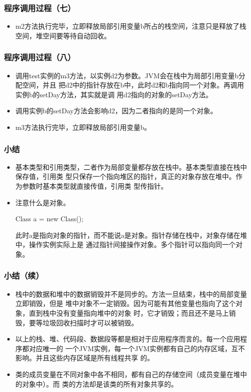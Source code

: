 \documentclass[hyperref={pdfpagelabels=false},compress,table]{beamer} %
\newcommand{\kai}{\CJKfamily{KaiTi}}
\begin{document}
\begin{frame}[fragile] %
\frametitle{程序调用过程（七）}
\begin{itemize}
\item m2方法执行完毕，立即释放局部引用变量b所占的栈空间，注意只是释放了栈空间，堆空间要等待自动回收。
\end{itemize}
\end{frame}

\begin{frame}[fragile] %
\frametitle{程序调用过程（八）}
\begin{itemize}
\item 调用test实例的m3方法，以实例d2为参数。JVM会在栈中为局部引用变量b分配空间，并且
  把d2中的指针存放在b中，此时d2和b指向同一个对象。再调用实例b的setDay方法，其实就是调
  用d2指向的对象的setDay方法。
\item 调用实例b的setDay方法会影响d2，因为二者指向的是同一个对象。
\item m3方法执行完毕，立即释放局部引用变量b。
\end{itemize}
\end{frame}

\begin{frame}[fragile] %
\frametitle{小结}
\begin{itemize}\kai
\item 基本类型和引用类型，二者作为局部变量都存放在栈中。基本类型直接在栈中保存值，引用类
  型只保存一个指向堆区的指针，真正的对象存放在堆中。作为参数时基本类型就直接传值，引用类
  型传指针。
\item 注意什么是对象。
\begin{javaCode}
  Class a = new Class();    
\end{javaCode}
此时a是指向对象的指针，而不能说a是对象。指针存储在栈中，对象存储在堆中，操作实例实际上是
通过指针间接操作对象。多个指针可以指向同一个对象。
\end{itemize}
\end{frame}

\begin{frame}[fragile] %
\frametitle{小结（续）}
\begin{itemize}\kai
\item 栈中的数据和堆中的数据销毁并不是同步的。方法一旦结束，栈中的局部变量立即销毁，但是
  堆中对象不一定销毁。因为可能有其他变量也指向了这个对象，直到栈中没有变量指向堆中的对象
  时，它才销毁；而且还不是马上销毁，要等垃圾回收扫描时才可以被销毁。
\item 以上的栈、堆、代码段、数据段等都是相对于应用程序而言的。每一个应用程序都对应唯一的
  一个JVM实例，每一个JVM实例都有自己的内存区域，互不影响。并且这些内存区域是所有线程共享
  的。
\item 类的成员变量在不同对象中各不相同，都有自己的存储空间（成员变量在堆中的对象中）。而
  类的方法却是该类的所有对象共享的。
\end{itemize}
\end{frame}
\end{document}
